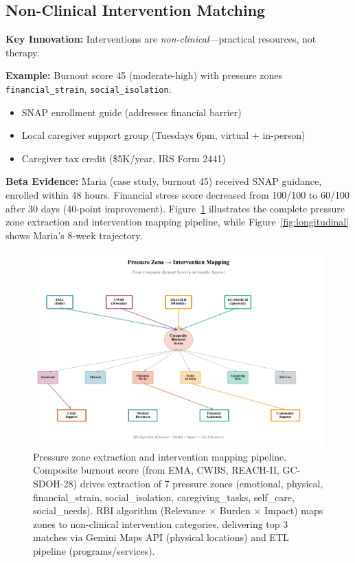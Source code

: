 \documentclass{article}%
\begin{document}
%
\subsection{Non{-}Clinical Intervention Matching}%
\label{subsec:Non{-}ClinicalInterventionMatching}%
\textbf{Key Innovation:} Interventions are \textit{non-clinical}—practical resources, not therapy.

\textbf{Example:} Burnout score 45 (moderate-high) with pressure zones \texttt{financial\_strain}, \texttt{social\_isolation}:
\begin{itemize}
    \item SNAP enrollment guide (addresses financial barrier)
    \item Local caregiver support group (Tuesdays 6pm, virtual + in-person)
    \item Caregiver tax credit (\$5K/year, IRS Form 2441)
\end{itemize}

\textbf{Beta Evidence:} Maria (case study, burnout 45) received SNAP guidance, enrolled within 48 hours. Financial stress score decreased from 100/100 to 60/100 after 30 days (40-point improvement). Figure~\ref{fig:pressure_zones} illustrates the complete pressure zone extraction and intervention mapping pipeline, while Figure~\ref{fig:longitudinal} shows Maria's 8-week trajectory.

%
\begin{figure}[htbp]%
\centering%
\includegraphics[width=\textwidth]{fig11_pressure_zones.pdf}%
\caption{Pressure zone extraction and intervention mapping pipeline. Composite burnout score (from EMA, CWBS, REACH-II, GC-SDOH-28) drives extraction of 7 pressure zones (emotional, physical, financial\_strain, social\_isolation, caregiving\_tasks, self\_care, social\_needs). RBI algorithm (Relevance $\times$ Burden $\times$ Impact) maps zones to non-clinical intervention categories, delivering top 3 matches via Gemini Maps API (physical locations) and ETL pipeline (programs/services).}%
\label{fig:pressure_zones}%
\end{figure}%
\end{document}
